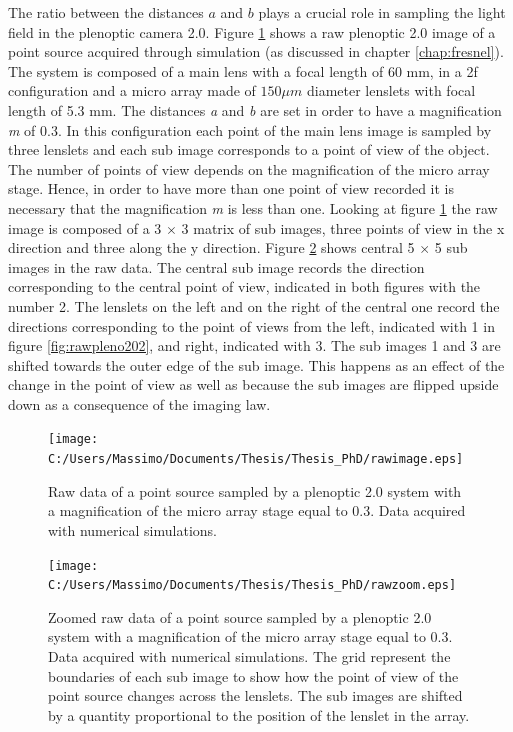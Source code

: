  The ratio between the distances $a$ and $b$ plays a crucial role in sampling the light field in the plenoptic camera 2.0. Figure \ref{fig:rawpleno20} shows a raw plenoptic 2.0 image of a point source acquired through simulation (as discussed in chapter \ref{chap:fresnel}). The system is composed of a main lens with a focal length of 60 mm, in a 2f configuration and a micro array made of $150 \mu m$ diameter lenslets with focal length of 5.3 mm. The distances \textit{a} and \textit{b} are set in order to have a magnification \textit{m} of 0.3. In this configuration each point of the main lens image is sampled by three lenslets and each sub image corresponds to a point of view of the object. The number of points of view depends on the magnification of the micro array stage. Hence, in order to have more than one point of view recorded it is necessary that the magnification \textit{m} is less than one. Looking at figure \ref{fig:rawpleno20} the raw image is composed of a 3 $\times$ 3 matrix of sub images, three points of view in the x direction and three along the y direction. Figure \ref{fig:rawpleno203} shows central 5 $\times$ 5 sub images in the raw data. The central sub image records the direction corresponding to the central point of view, indicated in both figures with the number 2. The lenslets on the left and on the right of the central one record the directions corresponding to the point of views from the left, indicated with 1 in figure \ref{fig:rawpleno202}, and right, indicated with 3. The sub images 1 and 3 are shifted towards the outer edge of the sub image. This happens as an effect of the change in the point of view as well as because the sub images are flipped upside down as a consequence of the imaging law.
  \begin{figure}[H]
 	\centering
 	\texttt{[image: C:/Users/Massimo/Documents/Thesis/Thesis\_PhD/rawimage.eps]}
 	\caption{\label{fig:rawpleno20} Raw data of a point source sampled by a plenoptic 2.0 system with a magnification of the micro array stage equal to 0.3. Data acquired with numerical simulations. }
 \end{figure}
 \begin{figure}[H]
 	\centering
 	\texttt{[image: C:/Users/Massimo/Documents/Thesis/Thesis\_PhD/rawzoom.eps]}
 	\caption{\label{fig:rawpleno203} Zoomed raw data of a point source sampled by a plenoptic 2.0 system with a magnification of the micro array stage equal to 0.3. Data acquired with numerical simulations. The grid represent the boundaries of each sub image to show how the point of view of the point source changes across the lenslets. The sub images are shifted by a quantity proportional to the position of the lenslet in the array.  }
 \end{figure}
